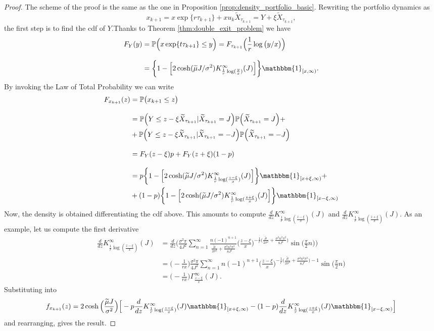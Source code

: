 \begin{proof}
	The scheme of the proof is the same as the one in Proposition \ref{prop:density_portfolio_basic}. Rewriting the portfolio dynamics as 
	\[ x_{k+1}=x\exp\{r\tau_{k+1}\}+xu_k\widetilde{X}_{\tau_{k+1}}=Y+\xi\widetilde{X}_{\tau_{k+1}}, \]
	the first step is to find the cdf of $Y$.Thanks to Theorem \ref{thm:double_exit_problem} we have
	\begin{align*}
	F_Y(y) & =\mathbb{P}\Big(x\exp\{t\tau_{k+1}\}\leq y\Big)= F_{\tau_{k+1}}\Big(\frac{1}{r}\log\big(y/x\big)\Big) \\[2ex]
	& = \bigg\{ 1-\Big[2\cosh(\widetilde{\mu}J/\sigma^2)K_{\frac{1}{r}\log(\frac{y}{x})}^{\infty}(J)  \Big]\bigg\}\mathbbm{1}_{[x,\infty)}.
	\end{align*}
	By invoking the Law of Total Probability we can write
	\begin{align*}
	F_{x_{k+1}}(z) & = \mathbb{P}\big(x_{k+1}\leq z\big) \\[2ex]
	& = \mathbb{P}\Big(Y\leq z-\xi\widetilde{X}_{\tau_{k+1}}\lvert\widetilde{X}_{\tau_{k+1}}=J\Big)\mathbb{P}\Big(\widetilde{X}_{\tau_{k+1}}=J\Big)+\\
	& + 
	\mathbb{P}\Big(Y\leq z-\xi\widetilde{X}_{\tau_{k+1}}\lvert\widetilde{X}_{\tau_{k+1}}=-J\Big)\mathbb{P}\Big(\widetilde{X}_{\tau_{k+1}}=-J\Big)\\[2ex]
	& = F_Y(z-\xi)p + F_Y(z+\xi)(1-p)\\[2ex]
	& = p\bigg\{ 1-\Big[2\cosh(\widetilde{\mu}J/\sigma^2)K_{\frac{1}{r}\log(\frac{z-\xi}{x})}^{\infty}(J)\Big]\bigg\}\mathbbm{1}_{[x+\xi,\infty)}+\\
	&+ (1-p)\bigg\{ 1-\Big[2\cosh(\widetilde{\mu}J/\sigma^2)K_{\frac{1}{r}\log(\frac{z+\xi}{x})}^{\infty}(J)\Big]\bigg\}\mathbbm{1}_{[x-\xi,\infty)}
	\end{align*}
	Now, the density is obtained differentiating the cdf above. This amounts to compute $\frac{d}{dz}K_{\frac{1}{r}\log(\frac{z-\xi}{x})}^{\infty}(J)$ and $\frac{d}{dz}K_{\frac{1}{r}\log(\frac{z+\xi}{x})}^{\infty}(J)$. As an example, let us compute the first derivative
	\begin{align*}
	\frac{d}{dz}K_{\frac{1}{r}\log(\frac{z-\xi}{x})}^{\infty}(J) & = \frac{d}{dz}\bigg(\frac{\sigma^2\pi}{4J^2}\sum_{n=1}^{\infty}\frac{n(-1)^{n+1}}{\frac{\tilde{\mu}}{2\sigma^2} + \frac{\sigma^2n^2\pi^2}{8J^2}}\Big(\frac{z-\xi}{x}\Big)^{-\frac{1}{r}\big(\frac{\tilde{\mu}}{2\sigma^2} + \frac{\sigma^2n^2\pi^2}{8J^2}\big)}\sin\big(\frac{\pi}{2}n\big)  \bigg)\\[2ex]
	& = \big(-\frac{1}{rx}\big)\frac{\sigma^2\pi}{4J^2}\sum_{n=1}^{\infty}n(-1)^{n+1} \Big(\frac{z-\xi}{x}\Big)^{-\frac{1}{r}\big(\frac{\tilde{\mu}}{2\sigma^2} + \frac{\sigma^2n^2\pi^2}{8J^2}\big)-1}\sin\big(\frac{\pi}{2}n\big)\\[2ex]
	& = \big(-\frac{1}{rx}\big)\Gamma_{\frac{z-\xi}{x}}^{\infty}(J).
	\end{align*}
	Substituting into
	\[
	f_{x_{k+1}}(z) =2\cosh\Big(\frac{\widetilde{\mu}J}{\sigma^2}\Big)\Big[-p\frac{d}{dz}K_{\frac{1}{r}\log(\frac{z-\xi}{x})}^{\infty}(J)\mathbbm{1}_{[x+\xi,\infty)}-(1-p)\frac{d}{dz}K_{\frac{1}{r}\log(\frac{z+\xi}{x})}^{\infty}(J)\mathbbm{1}_{[x-\xi,\infty)}\Big]
	\]
	and rearranging, gives the result.
\end{proof}
